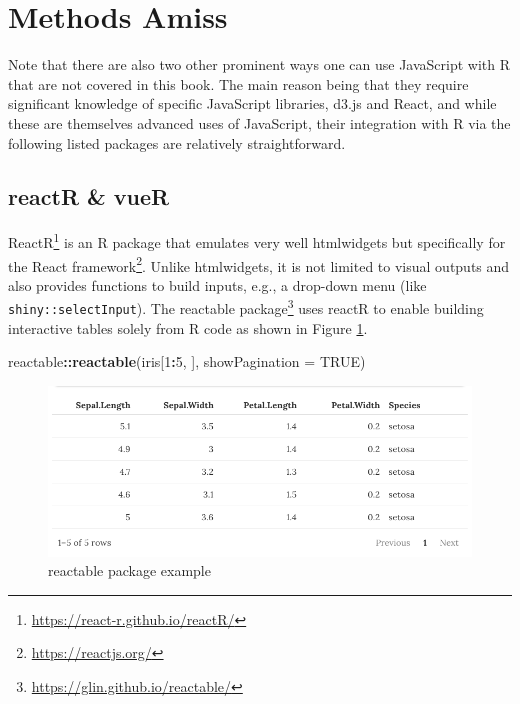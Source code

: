 \documentclass[10pt,]{krantz}
\makeatletter
\newenvironment{Shaded}{\begin{snugshade}}{\end{snugshade}}
\newcommand{\DataTypeTok}[1]{\textcolor[rgb]{0.27,0.27,0.27}{#1}}
\newcommand{\DecValTok}[1]{\textcolor[rgb]{0.06,0.06,0.06}{#1}}
\newcommand{\KeywordTok}[1]{\textcolor[rgb]{0.27,0.27,0.27}{\textbf{#1}}}
\newcommand{\NormalTok}[1]{#1}
\newcommand{\OperatorTok}[1]{\textcolor[rgb]{0.43,0.43,0.43}{\textbf{#1}}}
\newcommand{\OtherTok}[1]{\textcolor[rgb]{0.37,0.37,0.37}{#1}}
\renewcommand{\href}[2]{#2\footnote{\url{#1}}}
\newenvironment{kframe}{%
\medskip{}
\setlength{\fboxsep}{.8em}
 \def\at@end@of@kframe{}%
 \ifinner\ifhmode%
  \def\at@end@of@kframe{\end{minipage}}%
  \begin{minipage}{\columnwidth}%
 \fi\fi%
 \def\FrameCommand##1{\hskip\@totalleftmargin \hskip-\fboxsep
 \colorbox{shadecolor}{##1}\hskip-\fboxsep
     \hskip-\linewidth \hskip-\@totalleftmargin \hskip\columnwidth}%
 \MakeFramed {\advance\hsize-\width
   \@totalleftmargin\z@ \linewidth\hsize
   \@setminipage}}%
 {\par\unskip\endMakeFramed%
 \at@end@of@kframe}
\renewenvironment{Shaded}{\begin{kframe}}{\end{kframe}}
\makeatother
\begin{document}
\hypertarget{intro-amiss}{%
\section{Methods Amiss}\label{intro-amiss}}

Note that there are also two other prominent ways one can use JavaScript with R that are not covered in this book. The main reason being that they require significant knowledge of specific JavaScript libraries, d3.js and React, and while these are themselves advanced uses of JavaScript, their integration with R via the following listed packages are relatively straightforward.

\hypertarget{intro-reactr-vuer}{%
\subsection{reactR \& vueR}\label{intro-reactr-vuer}}

\href{https://react-r.github.io/reactR/}{ReactR} \citep{R-reactR} is an R package that emulates very well htmlwidgets but specifically for the \href{https://reactjs.org/}{React framework}. Unlike htmlwidgets, it is not limited to visual outputs and also provides functions to build inputs, e.g., a drop-down menu (like \texttt{shiny::selectInput}). The \href{https://glin.github.io/reactable/}{reactable package} \citep{R-reactable} uses reactR to enable building interactive tables solely from R code as shown in Figure \ref{fig:reactable-example}.

\begin{Shaded}
\begin{Highlighting}[]
\NormalTok{reactable}\OperatorTok{::}\KeywordTok{reactable}\NormalTok{(iris[}\DecValTok{1}\OperatorTok{:}\DecValTok{5}\NormalTok{, ], }\DataTypeTok{showPagination =} \OtherTok{TRUE}\NormalTok{)}
\end{Highlighting}
\end{Shaded}

\begin{figure}[H]

{\centering \includegraphics[width=1\linewidth]{images/01-reactable} 

}

\caption{reactable package example}\label{fig:reactable-example}
\end{figure}
\end{document}
